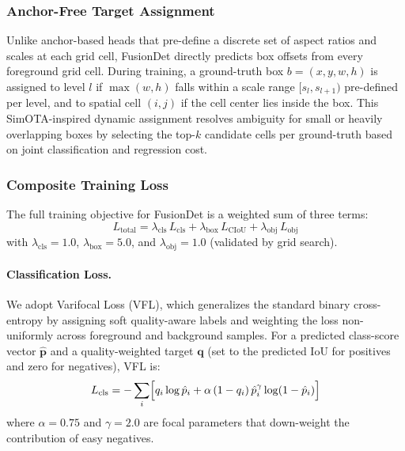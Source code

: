 \subsubsection{Anchor-Free Target Assignment}

Unlike anchor-based heads that pre-define a discrete set of
aspect ratios and scales at each grid cell, FusionDet directly
predicts box offsets from every foreground grid cell. During
training, a ground-truth box $b = (x, y, w, h)$ is assigned to
level $l$ if $\max(w, h)$ falls within a scale range
$[s_l, s_{l+1})$ pre-defined per level, and to spatial cell
$(i, j)$ if the cell center lies inside the box. This
SimOTA-inspired \cite{ge2021yolox} dynamic assignment resolves
ambiguity for small or heavily overlapping boxes by selecting
the top-$k$ candidate cells per ground-truth based on joint
classification and regression cost.

\subsubsection{Composite Training Loss}

The full training objective for FusionDet is a weighted sum of
three terms:
\begin{equation}
  L_{\text{total}} =
    \lambda_{\text{cls}}\,L_{\text{cls}}
    + \lambda_{\text{box}}\,L_{\text{CIoU}}
    + \lambda_{\text{obj}}\,L_{\text{obj}}
  \label{eq:loss_total}
\end{equation}
with $\lambda_{\text{cls}} = 1.0$, $\lambda_{\text{box}} = 5.0$,
and $\lambda_{\text{obj}} = 1.0$ (validated by grid search).

\paragraph{Classification Loss.}
We adopt Varifocal Loss (VFL), which generalizes the standard
binary cross-entropy by assigning soft quality-aware labels and
weighting the loss non-uniformly across foreground and
background samples. For a predicted class-score vector
$\hat{\mathbf{p}}$ and a quality-weighted target
$\mathbf{q}$ (set to the predicted IoU for positives and zero
for negatives), VFL is:
\begin{equation}
  L_{\text{cls}} = -\sum_{i}
  \Bigl[
    q_i \log \hat{p}_i
    + \alpha\,(1 - q_i)\,\hat{p}_i^{\gamma}
      \log(1 - \hat{p}_i)
  \Bigr]
  \label{eq:vfl}
\end{equation}
where $\alpha = 0.75$ and $\gamma = 2.0$ are focal parameters
that down-weight the contribution of easy negatives.

